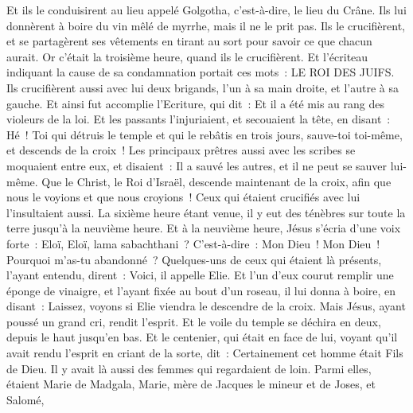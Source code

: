 \begin{multicols}{2}
Et ils le conduisirent au lieu appelé Golgotha, c'est-à-dire, le lieu du Crâne.
Ils lui donnèrent à boire du vin mêlé de myrrhe, mais il ne le prit pas.
Ils le crucifièrent, et se partagèrent ses vêtements en tirant au sort pour savoir ce que chacun aurait.
Or c'était la troisième heure, quand ils le crucifièrent.
Et l'écriteau indiquant la cause de sa condamnation portait ces mots~: LE ROI DES JUIFS.
Ils crucifièrent aussi avec lui deux brigands, l'un à sa main droite, et l'autre à sa gauche.
Et ainsi fut accomplie l'Ecriture, qui dit~: Et il a été mis au rang des violeurs de la loi.
Et les passants l'injuriaient, et secouaient la tête, en disant~: Hé~! Toi qui détruis le temple et qui le rebâtis en trois jours,
sauve-toi toi-même, et descends de la croix~!
Les principaux prêtres aussi avec les scribes se moquaient entre eux, et disaient~: Il a sauvé les autres, et il ne peut se sauver lui-même.
Que le Christ, le Roi d'Israël, descende maintenant de la croix, afin que nous le voyions et que nous croyions~! Ceux qui étaient crucifiés avec lui l'insultaient aussi.
La sixième heure étant venue, il y eut des ténèbres sur toute la terre jusqu'à la neuvième heure.
Et à la neuvième heure, Jésus s'écria d'une voix forte~: Eloï, Eloï, lama sabachthani~? C'est-à-dire~: Mon Dieu~! Mon Dieu~! Pourquoi m'as-tu abandonné~?
Quelques-uns de ceux qui étaient là présents, l'ayant entendu, dirent~: Voici, il appelle Elie.
Et l'un d'eux courut remplir une éponge de vinaigre, et l'ayant fixée au bout d'un roseau, il lui donna à boire, en disant~: Laissez, voyons si Elie viendra le descendre de la croix.
Mais Jésus, ayant poussé un grand cri, rendit l'esprit.
Et le voile du temple se déchira en deux, depuis le haut jusqu'en bas.
Et le centenier, qui était en face de lui, voyant qu'il avait rendu l'esprit en criant de la sorte, dit~: Certainement cet homme était Fils de Dieu.
Il y avait là aussi des femmes qui regardaient de loin. Parmi elles, étaient Marie de Madgala, Marie, mère de Jacques le mineur et de Joses, et Salomé,

\end{multicols}
